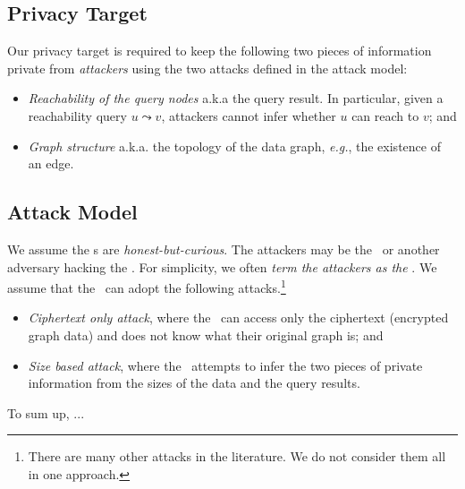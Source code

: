 \subsection{Privacy Target}
Our privacy target is
required to keep the following two pieces of information private from {\em attackers}
using the two attacks defined in the attack model: 
%
\begin{itemize}%
    \item {\em Reachability of the query nodes} a.k.a the query result. In
        particular, given a reachability query $u \leadsto v$, attackers cannot
        infer whether $u$ can reach to $v$; and
    \item {\em Graph structure} a.k.a. the topology of the data graph, {\it
        e.g.}, the existence of an edge.
\end{itemize} 


\subsection{Attack Model}
We assume the \SP s are {\em
  honest-but-curious}. The attackers  may be the
\SP\ or another adversary hacking the \SP.  For simplicity, we often {\em term the
  attackers as the \SP}. We assume that the \SP\ can adopt the
following attacks.\footnote{There are many other
  attacks in the literature.  We do not consider them all in
  one approach.}  
%
\begin{itemize}
    \item {\em Ciphertext only attack}, where the \SP\ can
        access only the ciphertext (encrypted graph data) and does not know what
        their original graph is; and 
    \item {\em Size based attack}, where the \SP\ attempts to infer the two pieces of private
        information from the sizes of the data and the query
        results.
\end{itemize} 


To sum up, ...
